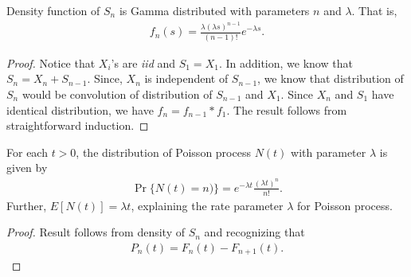 \documentclass[a4paper,10pt,english]{article}
\begin{document}
\begin{thm} Density function of $S_n$ is Gamma distributed with parameters $n$ and $\lambda$. That is,
\begin{align*}
f_{n}(s) =\frac{\lambda (\lambda s)^{n-1}} {(n-1)!} e^{-\lambda s}.
\end{align*}
\end{thm}
\begin{proof} Notice that $X_i$'s are \emph{iid} and $S_1 = X_1$. In addition, we know that $S_n = X_n + S_{n-1}$. Since, $X_n$ is independent of $S_{n-1}$, we know that distribution of $S_n$ would be convolution of distribution of $S_{n-1}$ and $X_1$. Since $X_n$ and $S_1$ have identical distribution, we have $f_{n}=f_{n-1}*f_{1}$. The result follows from straightforward induction.
\end{proof}

\begin{thm} For each $t >0$, the distribution of Poisson process $N(t)$ with parameter $\lambda$ is given by
	\begin{align*}
	\Pr\{N(t)=n)\}= e^{-\lambda t}\frac{(\lambda t)^{n}}{n!}.
	\end{align*}
Further, $E[N(t)] = \lambda t$, explaining the rate parameter $\lambda$ for Poisson process.
\end{thm}
\begin{proof}
Result follows from density of $S_n$ and recognizing that 
\begin{align*}
P_n(t) = F_n(t) - F_{n+1}(t).
\end{align*}
\end{proof}
\end{document}
